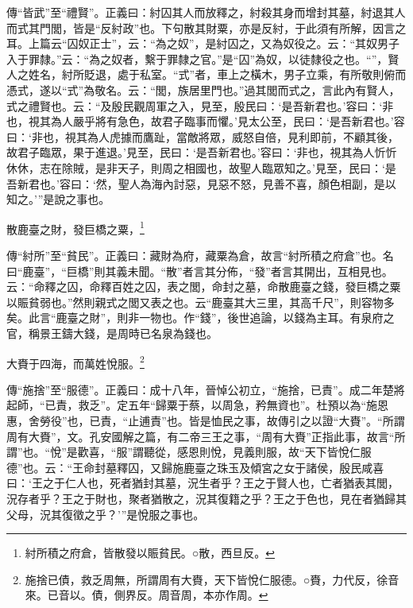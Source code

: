 {\noindent\zhuan{}\fzbyks 傳“皆武”至“禮賢”。正義曰：紂囚其人而放釋之，紂殺其身而增封其墓，紂退其人而式其門閭，皆是“反紂政”也。下句散其財粟，亦是反紂，于此須有所解，因言之耳。上篇云“囚奴正士”，云：“為之奴”，是紂囚之，又為奴役之。云：“其奴男子入于罪隸。”云：“為之奴者，繫于罪隸之官。”是“囚”為奴，以徒隸役之也。“”，賢人之姓名，紂所貶退，處于私室。“式”者，車上之橫木，男子立乘，有所敬則俯而憑式，遂以“式”為敬名。云：“閭，族居里門也。”過其閭而式之，言此內有賢人，式之禮賢也。云：“及殷民觀周軍之入，見至，殷民曰：‘是吾新君也。’容曰：‘非也，視其為人嚴乎將有急色，故君子臨事而懼。’見太公至，民曰：‘是吾新君也。’容曰：‘非也，視其為人虎據而鷹趾，當敵將眾，威怒自倍，見利即前，不顧其後，故君子臨眾，果于進退。’見至，民曰：‘是吾新君也。’容曰：‘非也，視其為人忻忻休休，志在除賊，是非天子，則周之相國也，故聖人臨眾知之。’見至，民曰：‘是吾新君也。’容曰：‘然，聖人為海內討惡，見惡不怒，見善不喜，顏色相副，是以知之。’”是說之事也。 \par}

散鹿臺之財，發巨橋之粟，\footnote{紂所積之府倉，皆散發以賑貧民。○散，西旦反。}

{\noindent\zhuan{}\fzbyks 傳“紂所”至“貧民”。正義曰：藏財為府，藏粟為倉，故言“紂所積之府倉”也。名曰“鹿臺”，“巨橋”則其義未聞。“散”者言其分佈，“發”者言其開出，互相見也。云：“命釋之囚，命釋百姓之囚，表之閭，命封之墓，命散鹿臺之錢，發巨橋之粟以賑貧弱也。”然則親式之閭又表之也。云“鹿臺其大三里，其高千尺”，則容物多矣。此言“鹿臺之財”，則非一物也。作“錢”，後世追論，以錢為主耳。有泉府之官，稱景王鑄大錢，是周時已名泉為錢也。 \par}

大賚于四海，而萬姓悅服。\footnote{施捨已債，救乏周無，所謂周有大賚，天下皆悅仁服德。○賚，力代反，徐音來。已音以。債，側界反。周音周，本亦作周。}

{\noindent\zhuan{}\fzbyks 傳“施捨”至“服德”。正義曰：成十八年，晉悼公初立，“施捨，已責”。成二年楚將起師，“已責，救乏”。定五年“歸粟于蔡，以周急，矜無資也”。杜預以為“施恩惠，舍勞役”也，已責，“止逋責”也。皆是恤民之事，故傳引之以證“大賚”。“所謂周有大賚”，文。孔安國解之篇，有二帝三王之事，“周有大賚”正指此事，故言“所謂”也。“悅”是歡喜，“服”謂聽從，感恩則悅，見義則服，故“天下皆悅仁服德”也。云：“王命封墓釋囚，又歸施鹿臺之珠玉及傾宮之女于諸侯，殷民咸喜曰：‘王之于仁人也，死者猶封其墓，況生者乎？王之于賢人也，亡者猶表其閭，況存者乎？王之于財也，聚者猶散之，況其復籍之乎？王之于色也，見在者猶歸其父母，況其復徵之乎？’”是悅服之事也。 \par}

